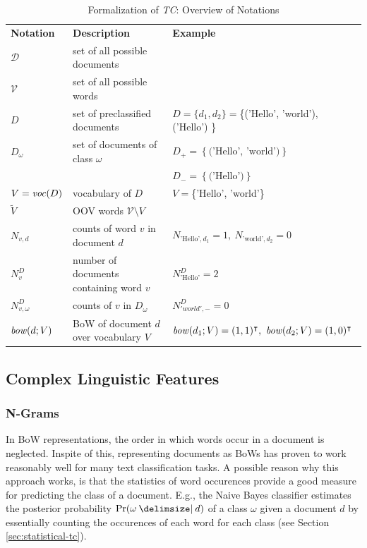 \begin{table}
\begin{tabular}{|l|l|l|}

\textbf{Notation} & \textbf{Description} & \textbf{Example} \\

$\mathcal{D}$ & set of all possible documents & \\
$\mathcal{V}$ & set of all possible words & \\
$D$ & set of preclassified documents & $D=\{ d_1, d_2\} = $\{('Hello', 'world'),
('Hello') \} \\

$D_\omega$ & set of documents of class $\omega$ & $D_+ = \left\{
\text{('Hello', 'world')} \right\}$ \\
& & $D_- = \left\{ \text{('Hello')} \right\}$ \\

$V = \mathit{voc}(D)$ & vocabulary of $D$ & $V=$\{'Hello', 'world'\} \\
$\tilde{V}$ & OOV words $\mathcal{V} \setminus V$ &  \\
$N_{v,d}$ & counts of word $v$ in document $d$ & $N_{\text{'Hello'}, d_1} = 1,\
N_{\text{'world'}, d_2} = 0$
\\

$N_v^D$ & number of documents containing word $v$ & $N_{\text{'Hello'}}^D = 2$
\\

$N_{v,\omega}^D$ & counts of $v$ in $D_\omega$ & $N_{'world', -}^D = 0$ \\

$\mathit{bow}(d; V)$ & BoW of document $d$ over vocabulary $V$ & $\mathit{bow}(d_1; V)
= (1, 1)^\intercal,\ \mathit{bow}(d_2; V) = (1,0)^\intercal$ \\

\end{tabular}
\caption{Formalization of \emph{TC}: Overview of Notations}
\label{tab:notations}
\end{table}

\subsection{Complex Linguistic Features}
\label{sec:complex-ling-feat}

\subsubsection{N-Grams}
\label{sssec:n-grams}
In BoW representations, the order in which words occur in a document is
neglected. Inspite of this, representing documents as BoWs has proven
to work reasonably well for many text classification tasks. A possible reason why this approach works, is
that the statistics of word occurences provide a good measure for predicting
the class of a document. E.g., the Naive Bayes classifier estimates the
posterior probability $\Pr(\omega\given d)$ of a class $\omega$ given a document $d$ by essentially counting the occurences 
of each word for each class (see Section \ref{sec:statistical-tc}).

